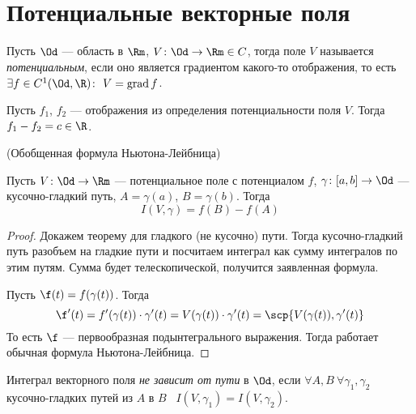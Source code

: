 \section{Потенциальные векторные поля}

\begin{definition}
    Пусть $\Od$ --- область в $\Rm$, $V \colon \Od \to \Rm \in C$, тогда поле
    $V$ называется \textit{потенциальным}, если оно является градиентом какого-то
    отображения, то есть $\exists f \in C^1(\Od, \R)\colon~ V = \operatorname{grad}
    f$.
\end{definition}

\begin{remark}
    Пусть $f_1$, $f_2$ --- отображения из определения потенциальности поля $V$.
    Тогда $f_1 - f_2 = c \in \R$.
\end{remark}

\begin{theorem}(Обобщенная формула Ньютона-Лейбница)

    Пусть $V \colon \Od \to \Rm$ --- потенциальное поле с потенциалом $f$,
    $\gamma \colon [a, b] \to \Od$ --- кусочно-гладкий путь, $A = \gamma(a)$,
    $B = \gamma(b)$. Тогда
\[
    I(V, \gamma) = f(B) - f(A)
\]
\end{theorem}
\begin{proof}
    Докажем теорему для гладкого (не кусочно) пути. Тогда кусочно-гладкий путь
    разобъем на гладкие пути и посчитаем интеграл как сумму интегралов по этим
    путям. Сумма будет телескопической, получится заявленная формула.

    Пусть $\f(t) = f(\gamma(t))$. Тогда
\[
    \f'(t) = f'(\gamma(t)) \cdot \gamma'(t) = V(\gamma(t)) \cdot \gamma'(t) =
    \scp{V(\gamma(t)), \gamma'(t)}
\]
    То есть $\f$ --- первообразная подынтегрального выражения. Тогда работает
    обычная формула Ньютона-Лейбница.
\end{proof}

\begin{definition}
    Интеграл векторного поля \textit{не зависит от пути} в $\Od$, если $\forall A, B~
    \forall \gamma_1, \gamma_2$ кусочно-гладких путей из $A$ в $B$~ $I(V, \gamma_1)
    = I(V, \gamma_2)$.
\end{definition}

